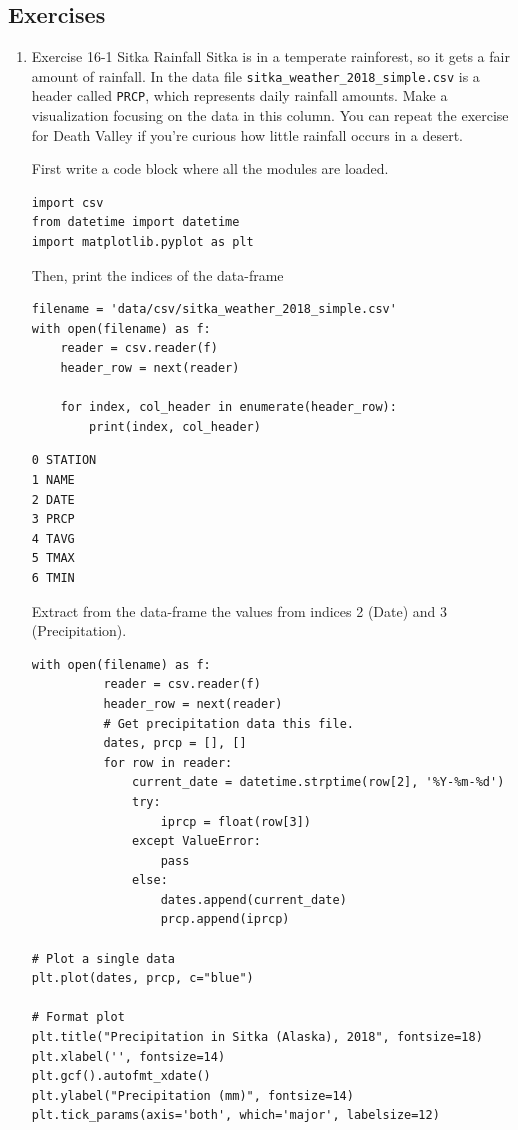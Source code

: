 \documentclass[10pt]{book}
\begin{document}
\subsection{Exercises}
\label{sec:org54ce496}
\begin{enumerate}
\item Exercise 16-1 Sitka Rainfall
\label{sec:orgfc782db}
Sitka is in a temperate rainforest, so it gets a fair amount of rainfall. In the data file \texttt{sitka\_weather\_2018\_simple.csv} is a header called \texttt{PRCP}, which represents daily rainfall amounts. Make a visualization focusing on the data in this column. You can repeat the exercise for Death Valley if you’re curious how little rainfall occurs in a desert.

First write a code block where all the modules are loaded.
\begin{verbatim}
import csv
from datetime import datetime
import matplotlib.pyplot as plt
\end{verbatim}

Then, print the indices of the data-frame
\begin{verbatim}
filename = 'data/csv/sitka_weather_2018_simple.csv'
with open(filename) as f:
    reader = csv.reader(f)
    header_row = next(reader)

    for index, col_header in enumerate(header_row):
        print(index, col_header)
\end{verbatim}

\label{org2aa0930}
\begin{verbatim}
0 STATION
1 NAME
2 DATE
3 PRCP
4 TAVG
5 TMAX
6 TMIN
\end{verbatim}

Extract from the data-frame the values from indices 2 (Date) and 3 (Precipitation).
\begin{verbatim}
with open(filename) as f:
          reader = csv.reader(f)
          header_row = next(reader)
          # Get precipitation data this file.
          dates, prcp = [], []
          for row in reader:
              current_date = datetime.strptime(row[2], '%Y-%m-%d')
              try:
                  iprcp = float(row[3])
              except ValueError:
                  pass
              else:
                  dates.append(current_date)
                  prcp.append(iprcp)

# Plot a single data
plt.plot(dates, prcp, c="blue")

# Format plot
plt.title("Precipitation in Sitka (Alaska), 2018", fontsize=18)
plt.xlabel('', fontsize=14)
plt.gcf().autofmt_xdate()
plt.ylabel("Precipitation (mm)", fontsize=14)
plt.tick_params(axis='both', which='major', labelsize=12)


\end{verbatim}
\end{enumerate}
\end{document}

